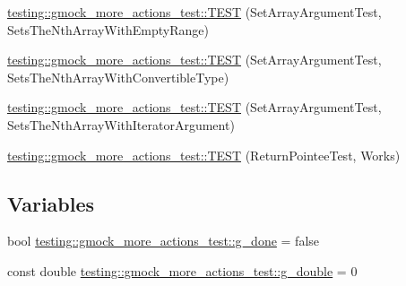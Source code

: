 \begin{DoxyCompactItemize}
\hyperlink{namespacetesting_1_1gmock__more__actions__test_a63a338ef41086b80dba5729ecd1073e5}{testing\+::gmock\+\_\+more\+\_\+actions\+\_\+test\+::\+T\+E\+ST} (Set\+Array\+Argument\+Test, Sets\+The\+Nth\+Array\+With\+Empty\+Range)
\item 
\hyperlink{namespacetesting_1_1gmock__more__actions__test_a42955fc99954c095f9d7ded3b92c091f}{testing\+::gmock\+\_\+more\+\_\+actions\+\_\+test\+::\+T\+E\+ST} (Set\+Array\+Argument\+Test, Sets\+The\+Nth\+Array\+With\+Convertible\+Type)
\item 
\hyperlink{namespacetesting_1_1gmock__more__actions__test_a5db6a5413414f6d9bb8a24d1f07bf882}{testing\+::gmock\+\_\+more\+\_\+actions\+\_\+test\+::\+T\+E\+ST} (Set\+Array\+Argument\+Test, Sets\+The\+Nth\+Array\+With\+Iterator\+Argument)
\item 
\hyperlink{namespacetesting_1_1gmock__more__actions__test_a690ef20bd9c281781eddcf99b18cff6c}{testing\+::gmock\+\_\+more\+\_\+actions\+\_\+test\+::\+T\+E\+ST} (Return\+Pointee\+Test, Works)
\end{DoxyCompactItemize}
\subsection*{Variables}
\begin{DoxyCompactItemize}
\item 
bool \hyperlink{namespacetesting_1_1gmock__more__actions__test_ab2d168581c62c89bd00cdadcccd9e8e4}{testing\+::gmock\+\_\+more\+\_\+actions\+\_\+test\+::g\+\_\+done} = false
\item 
const double \hyperlink{namespacetesting_1_1gmock__more__actions__test_a73552112032ff5d5900dd6f128a62718}{testing\+::gmock\+\_\+more\+\_\+actions\+\_\+test\+::g\+\_\+double} = 0
\end{DoxyCompactItemize}
